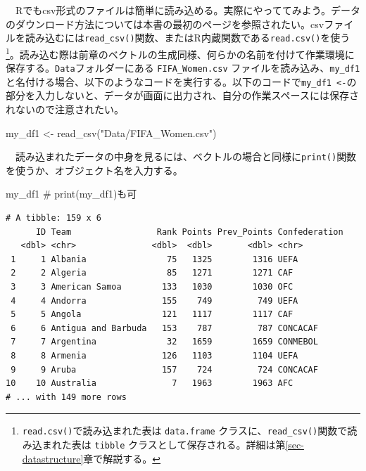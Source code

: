 \documentclass[
  a4paper,
  pandoc,
  ja=standard,
  jafont=haranoaji]{bxjsbook}
\newenvironment{Shaded}{\begin{snugshade}}{\end{snugshade}}
\newcommand{\CommentTok}[1]{\textcolor[rgb]{0.37,0.37,0.37}{#1}}
\newcommand{\FunctionTok}[1]{\textcolor[rgb]{0.28,0.35,0.67}{#1}}
\newcommand{\NormalTok}[1]{\textcolor[rgb]{0.00,0.48,0.65}{#1}}
\newcommand{\OtherTok}[1]{\textcolor[rgb]{0.00,0.48,0.65}{#1}}
\newcommand{\StringTok}[1]{\textcolor[rgb]{0.13,0.47,0.30}{#1}}
\begin{document}
　Rでもcsv形式のファイルは簡単に読み込める。実際にやっててみよう。データのダウンロード方法については本書の最初のページを参照されたい。csvファイルを読み込むには\texttt{read\_csv()}関数、またはR内蔵関数である\texttt{read.csv()}を使う\footnote{\texttt{read.csv()}で読み込まれた表は
  \texttt{data.frame}
  クラスに、\texttt{read\_csv()}関数で読み込まれた表は \texttt{tibble}
  クラスとして保存される。詳細は第\ref{sec-datastructure}章で解説する。}。読み込む際は前章のベクトルの生成同様、何らかの名前を付けて作業環境に保存する。\texttt{Data}フォルダーにある
\texttt{FIFA\_Women.csv}
ファイルを読み込み、\texttt{my\_df1}と名付ける場合、以下のようなコードを実行する。以下のコードで\texttt{my\_df1\ \textless{}-}の部分を入力しないと、データが画面に出力され、自分の作業スペースには保存されないので注意されたい。

\begin{Shaded}
\begin{Highlighting}[numbers=left,,]
\NormalTok{my\_df1 }\OtherTok{\textless{}{-}} \FunctionTok{read\_csv}\NormalTok{(}\StringTok{"Data/FIFA\_Women.csv"}\NormalTok{)}
\end{Highlighting}
\end{Shaded}

　読み込まれたデータの中身を見るには、ベクトルの場合と同様に\texttt{print()}関数を使うか、オブジェクト名を入力する。

\begin{Shaded}
\begin{Highlighting}[numbers=left,,]
\NormalTok{my\_df1 }\CommentTok{\# print(my\_df1)も可}
\end{Highlighting}
\end{Shaded}

\begin{verbatim}
# A tibble: 159 x 6
      ID Team                 Rank Points Prev_Points Confederation
   <dbl> <chr>               <dbl>  <dbl>       <dbl> <chr>        
 1     1 Albania                75   1325        1316 UEFA         
 2     2 Algeria                85   1271        1271 CAF          
 3     3 American Samoa        133   1030        1030 OFC          
 4     4 Andorra               155    749         749 UEFA         
 5     5 Angola                121   1117        1117 CAF          
 6     6 Antigua and Barbuda   153    787         787 CONCACAF     
 7     7 Argentina              32   1659        1659 CONMEBOL     
 8     8 Armenia               126   1103        1104 UEFA         
 9     9 Aruba                 157    724         724 CONCACAF     
10    10 Australia               7   1963        1963 AFC          
# ... with 149 more rows
\end{verbatim}
\end{document}
